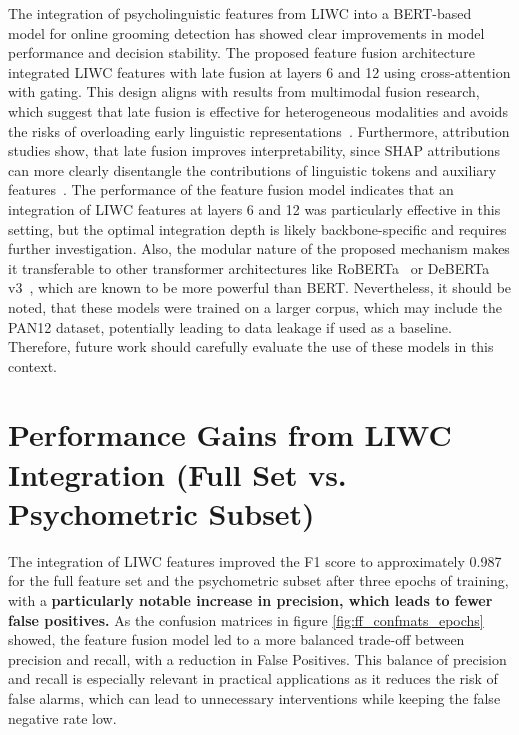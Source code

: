 The integration of psycholinguistic features from LIWC into a BERT-based model for online grooming detection has showed clear improvements in model performance and decision stability. The proposed feature fusion architecture integrated LIWC features with late fusion at layers 6 and 12 using cross-attention with gating. This design aligns with results from multimodal fusion research, which suggest that late fusion is effective for heterogeneous modalities and avoids the risks of overloading early linguistic representations~\cite{shankar2022progressivefusion}. Furthermore, attribution studies show, that late fusion improves interpretability, since SHAP attributions can more clearly disentangle the contributions of linguistic tokens and auxiliary features~\cite{shapcat2024interpretable}. The performance of the feature fusion model indicates that an integration of LIWC features at layers 6 and 12 was particularly effective in this setting, but the optimal integration depth is likely backbone-specific and requires further investigation. Also, the modular nature of the proposed mechanism makes it transferable to other transformer architectures like RoBERTa~\cite{liu2019roberta} or DeBERTa v3~\cite{he2023debertav3}, which are known to be more powerful than BERT. Nevertheless, it should be noted, that these models were trained on a larger corpus, which may include the PAN12 dataset, potentially leading to data leakage if used as a baseline. Therefore, future work should carefully evaluate the use of these models in this context.
\section{Performance Gains from LIWC Integration (Full Set vs. Psychometric Subset)}

The integration of LIWC features improved the F1 score to approximately 0.987 for the full feature set and the psychometric subset after three epochs of training, with a \textbf{particularly notable increase in precision, which leads to fewer false positives.} As the confusion matrices in figure \ref{fig:ff_confmats_epochs} showed, the feature fusion model led to a more balanced trade-off between precision and recall, with a reduction in False Positives. This balance of precision and recall is especially relevant in practical applications as it reduces the risk of false alarms, which can lead to unnecessary interventions while keeping the false negative rate low. 

